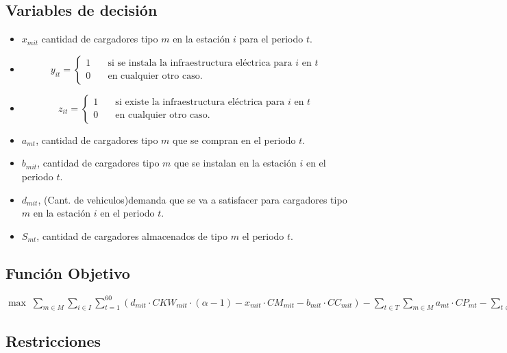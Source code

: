 \documentclass[letterpaper]{article}
\begin{document}
\begin{flushleft}
	\subsection{Variables de decisión}
	\begin{itemize}
		\item $x_{mit}$ cantidad de cargadores tipo $m$ en la estación $i$ para el periodo $t$.
		\item \[
			      y_{it} =
			      \begin{cases}
				      1 & \quad\text{si se instala la infraestructura eléctrica para }i\text{ en }t \\
				      0 & \quad\text{en cualquier otro caso.}
			      \end{cases}
		      \]
		\item \[
			      z_{it} =
			      \begin{cases}
				      1 & \quad\text{si existe la infraestructura eléctrica para }i\text{ en }t \\
				      0 & \quad\text{en cualquier otro caso.}
			      \end{cases}
		      \]
		\item $a_{mt}$, cantidad de cargadores tipo $m$ que se compran en el periodo $t$.
		\item $b_{mit}$, cantidad de cargadores tipo $m$ que se instalan en la estación $i$ en el periodo $t$.
		\item $d_{mit}$, (Cant. de vehiculos)demanda que se va a satisfacer para cargadores tipo $m$ en la estación $i$ en el periodo $t$.
		\item $S_{mt}$, cantidad de cargadores almacenados de tipo $m$ el periodo $t$.
	\end{itemize}
	\subsection{Función Objetivo}
	\begin{center}
		$\max \; \sum_{m \in M}\sum_{i \in I} \sum_{t=1}^{60} (d_{mit} \cdot CKW_{mit} \cdot (\alpha - 1) - x_{mit} \cdot CM_{mit} - b_{mit} \cdot CC_{mit}) - \sum_{t \in T} \sum_{m \in M} a_{mt} \cdot CP_{mt} - \sum_{t \in T}\sum_{m \in M} CS_{mt} \cdot S_{mt} - \sum_{t \in T} \sum_{i \in I} y_{it} \cdot CI_{it}$ 
	\end{center}

	\subsection{Restricciones}


\end{flushleft}
\end{document}
